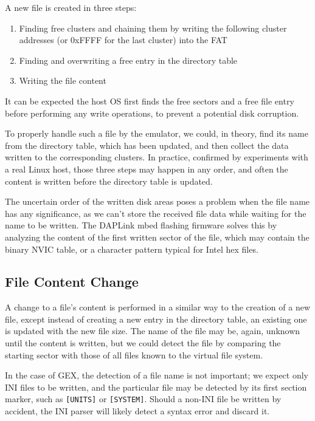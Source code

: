 A new file is created in three steps:

\begin{enumerate}
	\item Finding free clusters and chaining them by writing the following cluster addresses (or 0xFFFF for the last cluster) into the \gls{FAT}
	\item Finding and overwriting a free entry in the directory table
	\item Writing the file content
\end{enumerate}

It can be expected the host \gls{OS} first finds the free sectors and a free file entry before performing any write operations, to prevent a potential disk corruption.

To properly handle such a file by the emulator, we could, in theory, find its name from the directory table, which has been updated, and then collect the data written to the corresponding clusters. In practice, confirmed by experiments with a real Linux host, those three steps may happen in any order, and often the content is written before the directory table is updated.

The uncertain order of the written disk areas poses a problem when the file name has any significance, as we can't store the received file data while waiting for the name to be written. The DAPLink mbed flashing firmware solves this by analyzing the content of the first written sector of the file, which may contain the binary \gls{NVIC} table, or a character pattern typical for Intel hex files.

\subsection{File Content Change}

A change to a file's content is performed in a similar way to the creation of a new file, except instead of creating a new entry in the directory table, an existing one is updated with the new file size. The name of the file may be, again, unknown until the content is written, but we could detect the file by comparing the starting sector with those of all files known to the virtual file system.

In the case of GEX, the detection of a file name is not important; we expect only INI files to be written, and the particular file may be detected by its first section marker, such as \verb|[UNITS]| or \verb|[SYSTEM]|. Should a non-INI file be written by accident, the INI parser will likely detect a syntax error and discard it.

